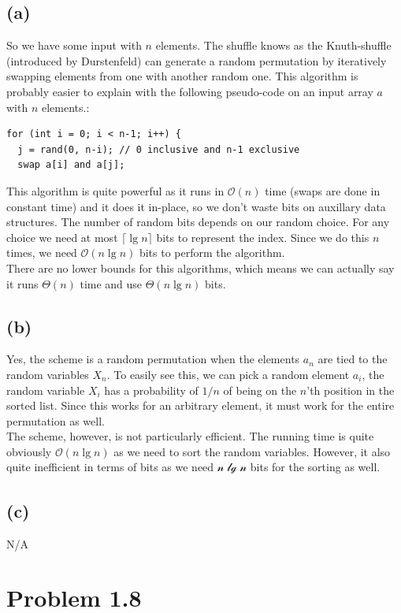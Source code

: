 \documentclass[a4paper]{article}
\begin{document}
\subsection*{(a)}
So we have some input with $n$ elements. The shuffle knows as the Knuth-shuffle (introduced by Durstenfeld) can generate a random permutation by iteratively swapping elements from one with another random one. This algorithm is probably easier to explain with the following pseudo-code on an input array $a$ with $n$ elements.:
\begin{lstlisting}
for (int i = 0; i < n-1; i++) {
  j = rand(0, n-i); // 0 inclusive and n-1 exclusive
  swap a[i] and a[j];
\end{lstlisting}
This algorithm is quite powerful as it runs in $\mathcal{O}(n)$ time (swaps are done in constant time) and it does it in-place, so we don't waste bits on auxillary data structures. The number of random bits depends on our random choice. For any choice we need at most $\lceil \lg n \rceil$ bits to represent the index. Since we do this $n$ times, we need $\mathcal{O}(n\lg n)$ bits to perform the algorithm. \\
There are no lower bounds for this algorithms, which means we can actually say it runs $\Theta(n)$ time and use $\Theta(n\lg n)$ bits.

\subsection*{(b)}
Yes, the scheme is a random permutation when the elements $a_n$ are tied to the random variables $X_n$. To easily see this, we can pick a random element $a_i$, the random variable $X_i$ has a probability of $1/n$ of being on the $n$'th position in the sorted list. Since this works for an arbitrary element, it must work for the entire permutation as well. \\
The scheme, however, is not particularly efficient. The running time is quite obviously $\mathcal{O}(n\lg n)$ as we need to sort the random variables. However, it also quite inefficient in terms of bits as we need $\mathcal{n\lg n}$ bits for the sorting as well.

\subsection*{(c)}
N/A


\section*{Problem 1.8}
\end{document}
